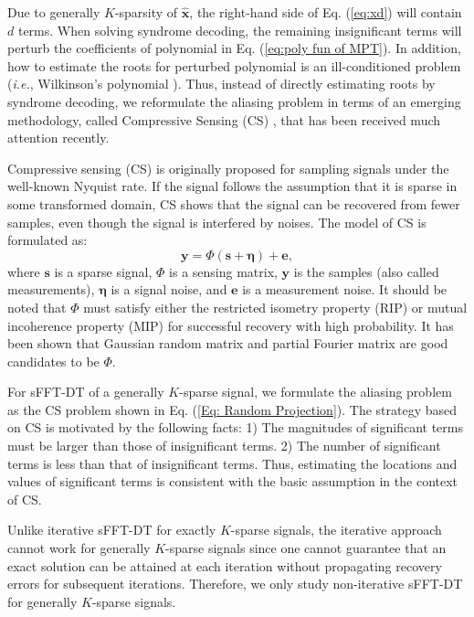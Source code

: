\documentclass[journal,onecolumn,11pt]{IEEEtran}
\begin{document}
Due to generally $K$-sparsity of $\bm{\hat{x}}$, the right-hand side of Eq. (\ref{eq:xd}) will contain $d$ terms.
When solving syndrome decoding, the remaining insignificant terms will perturb the coefficients of polynomial in Eq. (\ref{eq:poly fun of MPT}).
In addition, how to estimate the roots for perturbed polynomial is an ill-conditioned problem ({\em i.e.}, Wilkinson's polynomial \cite{Wilkinson1959}).
Thus, instead of directly estimating roots by syndrome decoding, we reformulate the aliasing problem in terms of an emerging methodology, called Compressive Sensing (CS) \cite{Donoho2006}\cite{Candes2008}, that has been received much attention recently.

Compressive sensing (CS) is originally proposed for sampling signals under the well-known Nyquist rate.
If the signal follows the assumption that it is sparse in some transformed domain, CS shows that the signal can be recovered from fewer samples, even though the signal is interfered by noises.
The model of CS is formulated as:
\begin{equation}
\bm{y}=\Phi (\bm{s}+\bm{\eta})+\bm{e},
\label{Eq: Random Projection}
\end{equation}
where $\bm{s}$ is a sparse signal, $\Phi$ is a sensing matrix, $\bm{y}$ is the samples (also called measurements), $\bm{\eta}$ is a signal noise, and $\bm{e}$ is a measurement noise.
It should be noted that $\Phi$ must satisfy either the restricted isometry property (RIP) \cite{Candes2005}\cite{Gan2009} or mutual incoherence property (MIP) \cite{Donoho2001}\cite{Welch1974} for successful recovery with high probability.
It has been shown that Gaussian random matrix and partial Fourier matrix \cite{Candes2006-F} are good candidates to be $\Phi$.

For sFFT-DT of a generally $K$-sparse signal, we formulate the aliasing problem as the CS problem shown in Eq. (\ref{Eq: Random Projection}).
The strategy based on CS is motivated by the following facts:
1) The magnitudes of significant terms must be larger than those of insignificant terms.
2) The number of significant terms is less than that of insignificant terms.
Thus, estimating the locations and values of significant terms is
consistent with the basic assumption in the context of CS.

Unlike iterative sFFT-DT for exactly $K$-sparse signals, the iterative approach cannot work for generally $K$-sparse signals since one cannot guarantee that an exact solution can be attained at each iteration without propagating recovery errors for subsequent iterations.
Therefore, we only study non-iterative sFFT-DT for generally $K$-sparse signals.
\end{document}
